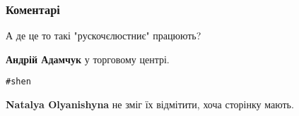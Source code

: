  
 
 
 
 
\subsubsection{Коментарі}
\label{sec:31_07_2021.fb.tarasenko_andrej.1.diskriminacia_blockbuster_mall.cmt}

\begin{itemize}
 
А де це то такі "рускочєлюстниє" працюють?

\begin{itemize}
 
\textbf{Андрій Адамчук} у торговому центрі.
\end{itemize}

 
\verb|#shen|

\begin{itemize}
 
\textbf{Natalya Olyanishyna} не зміг їх відмітити, хоча сторінку мають.

 

\end{itemize}
\end{itemize}
